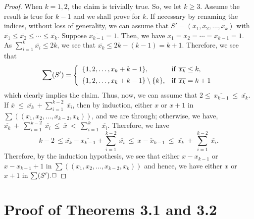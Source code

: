 \documentclass[fleqn]{mat01}
\begin{document}
\begin{proof}
When $k = 1,2$, the claim is trivially true. So, we let $k\geq 3$.
Assume the result is true for $k-1$ and we shall prove for $k$. If
necessary by renaming the indices, without loss of generality, we can
assume that $S' = (x_1,x_2,\ldots,x_k)$ with $\overline{x_1}\leq
\overline{x_2}\leq \cdots \leq \overline{x_k}$. Suppose
$\overline{x_{k-1}} = 1$. Then, we have $x_1 = x_2=\cdots=x_{k-1}=1$. As
$\sum_{i=1}^k\overline{x_i} \leq 2k$, we see that $\overline{x_k} \leq
2k - (k-1) = k+1$. Therefore, we see that
\begin{equation*}
\sum(S') = \left\{\begin{array}{ll}
\{1,2,\ldots,x_k+k-1\}, &{\rm if } \ \overline{x_k} \leq k,\\[.4pc]
\{1,2,\ldots,x_k+k-1\}\setminus\{k\},  &{\rm if } \ \overline{x_k} =
k+1 \end{array}\right.
\end{equation*}
which clearly implies the claim. Thus, now, we can assume that $2\leq \
\overline{x_{k-1}} \ \leq \ \overline{x_k}$. If $\overline{x} \ \leq \
\overline{x_k} \ + \sum_{i=1}^{k-2}\ \overline{x_i}$, then by induction,
either $x$ or $x+1$ in $\sum((x_1,x_2, \ldots,x_{k-2},x_k))$, and we are
through; otherwise, we have, $\overline{x_k} \ + \ \sum_{i=1}^{k-2}\
\overline{x_i} \ \leq \ \overline{x} \ < \ \sum_{i=1}^k \
\overline{x_i}$. Therefore, we have
\begin{equation*}
k-2 \ \leq \overline{x_k}-\overline{x_{k-1}}+ \sum_{i=1}^{k-2} \
\overline{x_i} \ \leq \ \overline{x-x_{k-1}} \ \leq \ \overline{x_k} \ +
\ \sum_{i=1}^{k-2} \ \overline{x_i}.
\end{equation*}
Therefore, by the induction hypothesis, we see that either $x-x_{k-1}$
or $x-x_{k-1}+1$ in $\sum((x_1, x_2, \ldots,x_{k-2},x_k))$ and hence, we
have either $x$ or $x+1$ in $\sum(S').\hfill\Box$
\end{proof}

\section{Proof of Theorems 3.1 and 3.2}
\end{document}
